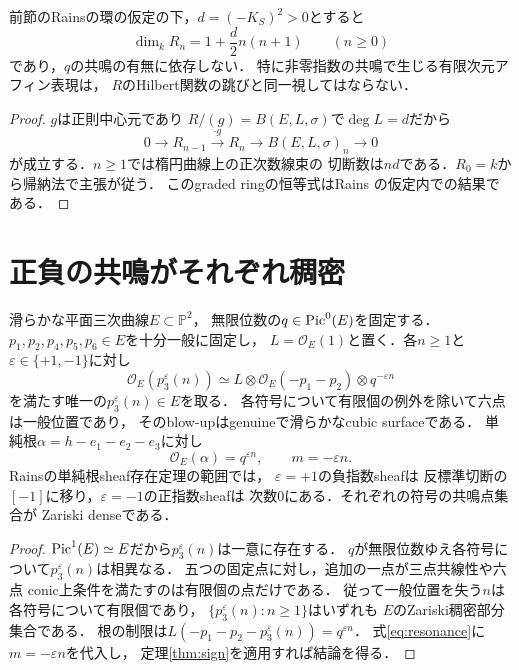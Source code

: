 \begin{proposition}[共鳴による反標準環のHilbert関数の跳びはない]
\label{prop:hilbert-no-jump}
前節のRainsの環の仮定の下，$d=(-K_S)^2>0$とすると
\[
 \dim_k R_n=1+\frac d2 n(n+1)\qquad(n\ge0)
\]
であり，$q$の共鳴の有無に依存しない．
特に非零指数の共鳴で生じる有限次元アフィン表現は，
$R$のHilbert関数の跳びと同一視してはならない．
\end{proposition}
\begin{proof}
$g$は正則中心元であり
$R/(g)=B(E,L,\sigma)$で$\deg L=d$だから
\[
0\longrightarrow R_{n-1}\xrightarrow{\cdot g}R_n
\longrightarrow B(E,L,\sigma)_n\longrightarrow0
\]
が成立する．$n\ge1$では楕円曲線上の正次数線束の
切断数は$nd$である．$R_0=k$から帰納法で主張が従う．
このgraded ringの恒等式はRains
\cite[Proposition 5.1]{RainsFiltered}の仮定内での結果である．
\end{proof}




\section{正負の共鳴がそれぞれ稠密}
\begin{theorem}[正負各指数のZariski稠密性]
\label{thm:dense-both}
滑らかな平面三次曲線$E\subset\mathbb P^2$，
無限位数の$q\in\operatorname{Pic}^0(E)$を固定する．
$p_1,p_2,p_4,p_5,p_6\in E$を十分一般に固定し，
$L=\mathcal O_E(1)$と置く．各$n\ge1$と$\varepsilon\in\{+1,-1\}$に対し
\[
 \mathcal O_E(p_3^\varepsilon(n))\simeq
 L\otimes\mathcal O_E(-p_1-p_2)\otimes q^{-\varepsilon n}
\]
を満たす唯一の$p_3^\varepsilon(n)\in E$を取る．
各符号について有限個の例外を除いて六点は一般位置であり，
そのblow-upはgenuineで滑らかなcubic surfaceである．
単純根$\alpha=h-e_1-e_2-e_3$に対し
\[
 \mathcal O_E(\alpha)=q^{\varepsilon n},\qquad
 m=-\varepsilon n.
\]
Rainsの単純根sheaf存在定理の範囲では，
$\varepsilon=+1$の負指数sheafは
反標準切断の$[-1]$に移り，$\varepsilon=-1$の正指数sheafは
次数0にある．それぞれの符号の共鳴点集合が
Zariski denseである．
\end{theorem}
\begin{proof}
$\operatorname{Pic}^1(E)\simeq E$だから$p_3^\varepsilon(n)$は一意に存在する．
$q$が無限位数ゆえ各符号について$p_3^\varepsilon(n)$は相異なる．
五つの固定点に対し，追加の一点が三点共線性や六点
conic上条件を満たすのは有限個の点だけである．
従って一般位置を失う$n$は各符号について有限個であり，
$\{p_3^\varepsilon(n):n\ge1\}$はいずれも
$E$のZariski稠密部分集合である．
根の制限は$L(-p_1-p_2-p_3^\varepsilon(n))=q^{\varepsilon n}$．
式\eqref{eq:resonance}に$m=-\varepsilon n$を代入し，
定理\ref{thm:sign}を適用すれば結論を得る．
\end{proof}

